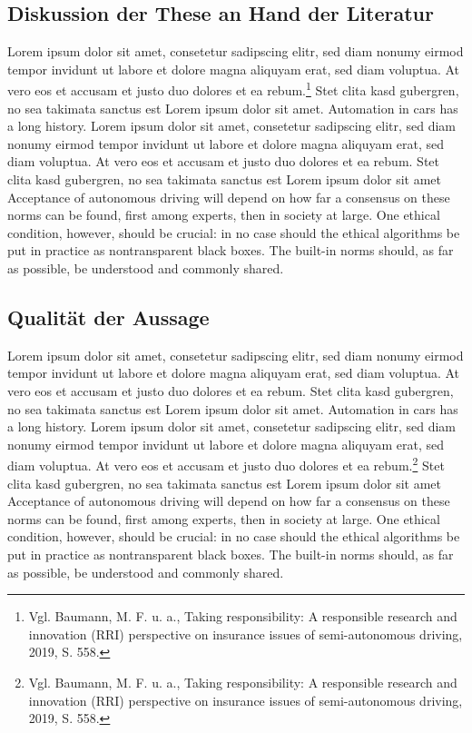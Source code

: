 \subsection{Diskussion der These an Hand der Literatur}

Lorem ipsum dolor sit amet, consetetur sadipscing elitr, sed diam nonumy eirmod tempor invidunt ut labore et dolore magna aliquyam erat, sed diam voluptua.
At vero eos et accusam et justo duo dolores et ea rebum.\footnote{Vgl. Baumann, M. F. u. a., Taking responsibility: A responsible research and innovation (RRI) perspective on insurance issues of semi-autonomous driving, 2019, S. 558.}
Stet clita kasd gubergren, no sea takimata sanctus est Lorem ipsum dolor sit amet.
Automation in cars has a long history.  Lorem ipsum dolor sit amet, consetetur sadipscing elitr, sed diam nonumy eirmod tempor invidunt ut labore et dolore magna aliquyam erat, sed diam voluptua.
At vero eos et accusam et justo duo dolores et ea rebum.
Stet clita kasd gubergren, no sea takimata sanctus est Lorem ipsum dolor sit amet Acceptance of autonomous driving will depend on how far a consensus on these norms can be found, first among experts, then in society at large.
One ethical condition, however, should be crucial: in no case should the ethical algorithms be put in practice as nontransparent black boxes.
The built-in norms should, as far as possible, be understood and commonly shared.

\subsection{Qualität der Aussage}

Lorem ipsum dolor sit amet, consetetur sadipscing elitr, sed diam nonumy eirmod tempor invidunt ut labore et dolore magna aliquyam erat, sed diam voluptua.
At vero eos et accusam et justo duo dolores et ea rebum.
Stet clita kasd gubergren, no sea takimata sanctus est Lorem ipsum dolor sit amet.
Automation in cars has a long history.  Lorem ipsum dolor sit amet, consetetur sadipscing elitr, sed diam nonumy eirmod tempor invidunt ut labore et dolore magna aliquyam erat, sed diam voluptua.
At vero eos et accusam et justo duo dolores et ea rebum.\footnote{Vgl. Baumann, M. F. u. a., Taking responsibility: A responsible research and innovation (RRI) perspective on insurance issues of semi-autonomous driving, 2019, S. 558.}
Stet clita kasd gubergren, no sea takimata sanctus est Lorem ipsum dolor sit amet Acceptance of autonomous driving will depend on how far a consensus on these norms can be found, first among experts, then in society at large.
One ethical condition, however, should be crucial: in no case should the ethical algorithms be put in practice as nontransparent black boxes.
The built-in norms should, as far as possible, be understood and commonly shared.

